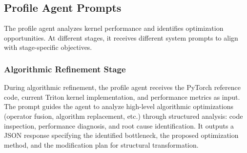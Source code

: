 \subsection{Profile Agent Prompts}

The profile agent analyzes kernel performance and identifies optimization opportunities. At different stages, it receives different system prompts to align with stage-specific objectives.

\subsubsection{Algorithmic Refinement Stage}

During algorithmic refinement, the profile agent receives the PyTorch reference code, current Triton kernel implementation, and performance metrics as input. The prompt guides the agent to analyze high-level algorithmic optimizations (operator fusion, algorithm replacement, etc.) through structured analysis: code inspection, performance diagnosis, and root cause identification. It outputs a JSON response specifying the identified bottleneck, the proposed optimization method, and the modification plan for structural transformation.


